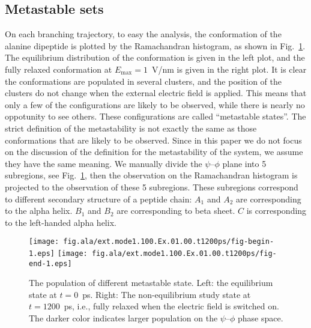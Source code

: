 \documentclass[aip,jcp,a4paper,preprint,onecolumn]{revtex4-1}
\begin{document}
\subsection{Metastable sets}

On each branching trajectory, to easy the analysis, the conformation
of the alanine dipeptide is plotted by the Ramachandran histogram, as
shown in Fig.~\ref{fig:tmp4}. The equilibrium distribution of the
conformation is given in the left plot, and the fully relaxed
conformation at $E_{\max} = 1$~V/nm is given in the right plot.  It is
clear the conformations are populated in several clusters, and the
position of the clusters do not change when the external electric
field is applied. This means that only a few of the configurations are likely to be observed, while there is nearly
no oppotunity to see others. 
These configurations are called ``metastable states''. The strict definition of the
metastability is not exactly the same as those conformations that are likely to be observed.
Since in this paper we do not focus on the discussion of the definition for the metastability of the system,
we assume they have the same meaning.
We manually divide the
$\psi$--$\phi$ plane into 5 subregions, see Fig.~\ref{fig:tmp4},
then the observation on the Ramachandran histogram is projected to the
observation of these 5 subregions.  These subregions
correspond to different secondary structure of a peptide chain:
$A_1$ and $A_2$ are
corresponding to the alpha helix. $B_1$ and $B_2$ are
corresponding to beta sheet. $C$ is corresponding to the
left-handed alpha helix.

\begin{figure}
  \centering
  \texttt{[image: fig.ala/ext.mode1.100.Ex.01.00.t1200ps/fig-begin-1.eps]}
  \texttt{[image: fig.ala/ext.mode1.100.Ex.01.00.t1200ps/fig-end-1.eps]}
  \caption{The population of different metastable state. Left: the equilibrium state at $t=0$~\textsf{ps}. Right: The non-equilibrium study state at $t=1200$~\textsf{ps}, i.e., fully relaxed when the electric field is switched on. The darker color indicates larger population on the $\psi$--$\phi$ phase space.}
  \label{fig:tmp4}
\end{figure}
\end{document}
